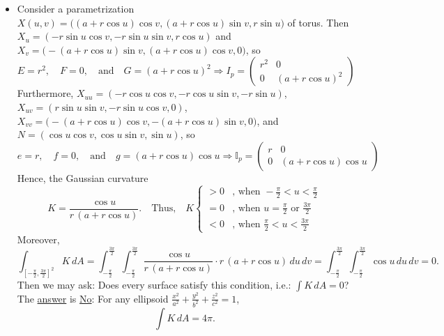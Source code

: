 \begin{itemize}
\[\]
Hence, by the Weingarten equation,
\[
\big(-dN_p\big)_\mathcal{B} = I_p^{-1}\mathbb{I}_p = \frac{1}{\cosh^2 v}\begin{pmatrix}1 & 0\\ 0 & 1\end{pmatrix}\begin{pmatrix}-1 & 0\\ 0 & 1\end{pmatrix} = \begin{pmatrix}-\frac{1}{\cosh^2 v} & 0\\[2mm] 0 & \frac{1}{\cosh^2 v}\end{pmatrix}
\]
and the mean curvature $H = 0$ and the Gaussian curvature $K = -\frac{1}{\cosh^4 v}$.
\item Consider a parametrization $X(u, v) = \big((a+r\cos u)\cos v, (a+r\cos u)\sin v, r\sin u\big)$ of torus. Then $X_u = (-r\sin u\cos v, -r\sin u\sin v, r\cos u)$ and $X_v = \big(-(a+r\cos u)\sin v, (a+r\cos u)\cos v, 0\big)$, so
\[
E = r^2, \quad F = 0, \quad\text{and}\quad G = (a+r\cos u)^2 \Rightarrow I_p = \begin{pmatrix}r^2 & 0\\ 0 & (a+r\cos u)^2\end{pmatrix}
\]
Furthermore, $X_{uu} = (-r\cos u\cos v, -r\cos u\sin v, -r\sin u)$, $X_{uv} = (r\sin u\sin v, -r\sin u\cos v, 0)$, $X_{vv} = \big(-(a+r\cos u)\cos v, -(a+r\cos u)\sin v, 0\big)$, and $N = (\cos u\cos v, \cos u\sin v, \sin u)$, so
\[
e = r, \quad f = 0, \quad\text{and}\quad g = (a+r\cos u)\cos u \Rightarrow \mathbb{I}_p = \begin{pmatrix}r & 0\\ 0 & (a+r\cos u)\cos u\end{pmatrix}
\]
Hence, the Gaussian curvature
\[
K = \frac{\cos u}{r\,(a+r\cos u)}. \quad\text{Thus,}\quad K\begin{cases}
> 0 & \text{, when } -\frac{\pi}{2} < u < \frac{\pi}{2}\\
= 0 & \text{, when } u = \frac{\pi}{2} \text{ or } \frac{3\pi}{2}\\
< 0 & \text{, when } \frac{\pi}{2} < u < \frac{3\pi}{2}
\end{cases}
\]
Moreover,
\[
\int_{\left[-\frac{\pi}{2}, \frac{3\pi}{2}\right]^2} K\,dA = \int_{-\frac{\pi}{2}}^{\frac{3\pi}{2}}\int_{-\frac{\pi}{2}}^{\frac{3\pi}{2}}\frac{\cos u}{r\,(a+r\cos u)}\cdot r\,(a+r\cos u)\,du\,dv = \int_{-\frac{\pi}{2}}^{\frac{3\pi}{2}}\int_{-\frac{\pi}{2}}^{\frac{3\pi}{2}}\cos u\,du\,dv = 0.
\]
Then we may ask: Does every surface satisfy this condition, i.e.: $\int K\,dA = 0$? The \underline{answer} is \underline{No}: For any ellipsoid $\frac{x^2}{a^2} + \frac{y^2}{b^2} + \frac{z^2}{c^2} = 1$,
\[
\int K\,dA = 4\pi.
\]
\end{itemize}

